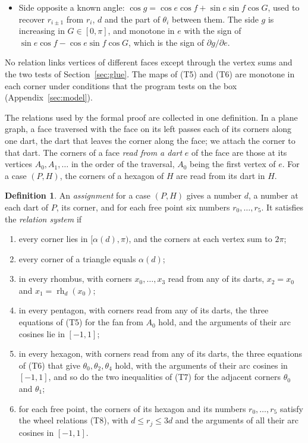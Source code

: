 \documentclass[12pt]{amsart}
\theoremstyle{definition}
\newtheorem{definition}[theorem]{Definition}
\theoremstyle{plain}
\theoremstyle{definition}
\newcommand{\leanmap}[1]{\ignorespaces}
\begin{document}
\begin{itemize}
\item[(T9)] Side opposite a known angle: $\cos g=\cos e\cos f+\sin e\sin f\cos G$, used to recover $r_{i\pm1}$ from $r_i$, $d$ and the part of $\theta_i$ between them. The side $g$ is increasing in $G\in[0,\pi]$, and monotone in $e$ with the sign of $\sin e\cos f-\cos e\sin f\cos G$, which is the sign of $\partial g/\partial e$.
\end{itemize}
No relation links vertices of different faces except through the vertex sums and the two tests of Section~\ref{sec:glue}. The maps of (T5) and (T6) are monotone in each corner under conditions that the program tests on the box (Appendix~\ref{sec:model}).

The relations used by the formal proof are collected in one definition. In a plane graph, a face traversed with the face on its left passes each of its corners along one dart, the dart that leaves the corner along the face; we attach the corner to that dart. The corners of a face \emph{read from a dart} $e$ of the face are those at its vertices $A_0,A_1,\dots$ in the order of the traversal, $A_0$ being the first vertex of $e$. For a case $(P,H)$, the corners of a hexagon of $H$ are read from its dart in $H$.

\begin{definition}\label{def:relsys}\leanmap{Tammes15.Assign, Tammes15.RelSys, Tammes15.PentRel, Tammes15.HexRel, Tammes15.HexDiagRel, Tammes15.longDiag, Tammes15.WheelRel}
An \emph{assignment} for a case $(P,H)$ gives a number $d$, a number at each dart of $P$, its corner, and for each free point six numbers $r_0,\dots,r_5$. It satisfies the \emph{relation system} if
\begin{enumerate}
\item every corner lies in $[\alpha(d),\pi)$, and the corners at each vertex sum to $2\pi$;
\item every corner of a triangle equals $\alpha(d)$;
\item in every rhombus, with corners $x_0,\dots,x_3$ read from any of its darts, $x_2=x_0$ and $x_1=\operatorname{rh}_d(x_0)$;
\item in every pentagon, with corners read from any of its darts, the three equations of (T5) for the fan from $A_0$ hold, and the arguments of their arc cosines lie in $[-1,1]$;
\item in every hexagon, with corners read from any of its darts, the three equations of (T6) that give $\theta_0,\theta_2,\theta_4$ hold, with the arguments of their arc cosines in $[-1,1]$, and so do the two inequalities of (T7) for the adjacent corners $\theta_0$ and $\theta_1$;
\item for each free point, the corners of its hexagon and its numbers $r_0,\dots,r_5$ satisfy the wheel relations (T8), with $d\le r_j\le3d$ and the arguments of all their arc cosines in $[-1,1]$.
\end{enumerate}
\end{definition}
\end{document}
